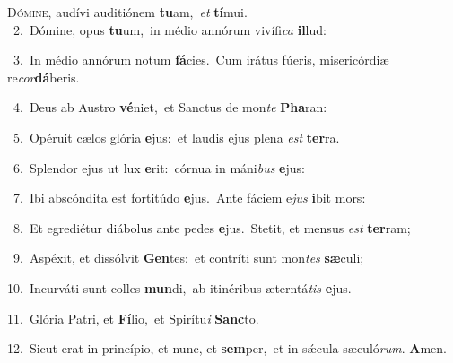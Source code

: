 \lettrine{\initial\textcolor{\initialcolor}{D}}{ómine,} audívi auditiónem \textbf{tu}\-am,~\star \textit{et} \textbf{tí}\-mui.\\
{\numbfont\textcolor{\numbcolor}{~2.}}~Dómine, opus \textbf{tu}\-um,~\star in médio annórum vivífi\textit{ca} \textbf{il}\-lud:\par
{\numbfont\textcolor{\numbcolor}{~3.}}~In médio annórum notum \textbf{fá}\-cies.~\star Cum irátus fúeris, misericórdiæ re\-\textit{cor}\-\textbf{dá}beris.\par
{\numbfont\textcolor{\numbcolor}{~4.}}~Deus ab Austro \textbf{vé}\-niet,~\star et Sanctus de mon\textit{te} \textbf{Pha}\-ran:\par
{\numbfont\textcolor{\numbcolor}{~5.}}~Opéruit cælos glória \textbf{e}\-jus:~\star et laudis ejus plena \textit{est} \textbf{ter}\-ra.\par
{\numbfont\textcolor{\numbcolor}{~6.}}~Splendor ejus ut lux \textbf{e}\-rit:~\star córnua in máni\textit{bus} \textbf{e}\-jus:\par
{\numbfont\textcolor{\numbcolor}{~7.}}~Ibi abscóndita est fortitúdo \textbf{e}\-jus.~\star Ante fáciem e\textit{jus} \textbf{i}\-bit mors:\par
{\numbfont\textcolor{\numbcolor}{~8.}}~Et egrediétur diábolus ante pedes \textbf{e}\-jus.~\star Stetit, et mensus \textit{est} \textbf{ter}\-ram;\par
{\numbfont\textcolor{\numbcolor}{~9.}}~Aspéxit, et dissólvit \textbf{Gen}\-tes:~\star et contríti sunt mon\textit{tes} \textbf{sæ}\-culi;\par
{\numbfont\textcolor{\numbcolor}{10.}}~Incurváti sunt colles \textbf{mun}\-di,~\star ab itinéribus æterntá\textit{tis} \textbf{e}\-jus.\par
{\numbfont\textcolor{\numbcolor}{11.}}~Glória Patri, et \textbf{Fí}\-lio,~\star et Spirítu\textit{i} \textbf{Sanc}\-to.\par
{\numbfont\textcolor{\numbcolor}{12.}}~Sicut erat in princípio, et nunc, et \textbf{sem}\-per,~\star et in sǽcula sæculó\-\textit{rum}\-. \textbf{A}\-men.\par

